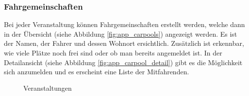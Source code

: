 \subsubsection{Fahrgemeinschaften}
Bei jeder Veranstaltung können Fahrgemeinschaften erstellt werden, welche dann in der Übersicht (siehe Abbildung \ref{fig:app_carpools}) angezeigt werden. Es ist der Namen, der Fahrer und dessen Wohnort ersichtlich. Zusätzlich ist erkennbar, wie viele Plätze noch frei sind oder ob man bereits angemeldet ist. In der Detailansicht (siehe Abbildung \ref{fig:app_carpool_detail}) gibt es die Möglichkeit sich anzumelden und es erscheint eine Liste der Mitfahrenden.
\begin{figure}[ht]
\centering
{}
\label{fig:app_carpool_page}
\caption{Veranstaltungen}
\end{figure}

